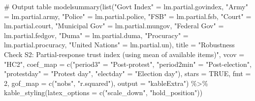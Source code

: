 \documentclass[
  letterpaper,
  DIV=11,
  numbers=noendperiod]{scrartcl}
\newenvironment{Shaded}{\begin{snugshade}}{\end{snugshade}}
\newcommand{\AttributeTok}[1]{\textcolor[rgb]{0.40,0.45,0.13}{#1}}
\newcommand{\CommentTok}[1]{\textcolor[rgb]{0.37,0.37,0.37}{#1}}
\newcommand{\ConstantTok}[1]{\textcolor[rgb]{0.56,0.35,0.01}{#1}}
\newcommand{\DecValTok}[1]{\textcolor[rgb]{0.68,0.00,0.00}{#1}}
\newcommand{\FunctionTok}[1]{\textcolor[rgb]{0.28,0.35,0.67}{#1}}
\newcommand{\NormalTok}[1]{\textcolor[rgb]{0.00,0.23,0.31}{#1}}
\newcommand{\OtherTok}[1]{\textcolor[rgb]{0.00,0.23,0.31}{#1}}
\newcommand{\SpecialCharTok}[1]{\textcolor[rgb]{0.37,0.37,0.37}{#1}}
\newcommand{\StringTok}[1]{\textcolor[rgb]{0.13,0.47,0.30}{#1}}
\begin{document}
\begin{Shaded}
\begin{Highlighting}[]
\CommentTok{\# Output table}
\FunctionTok{modelsummary}\NormalTok{(}\FunctionTok{list}\NormalTok{(}\StringTok{"Gov\textquotesingle{}t Index"} \OtherTok{=}\NormalTok{ lm.partial.govindex, }\StringTok{"Army"} \OtherTok{=}\NormalTok{ lm.partial.army,}
                  \StringTok{"Police"} \OtherTok{=}\NormalTok{ lm.partial.police, }\StringTok{"FSB"} \OtherTok{=}\NormalTok{ lm.partial.fsb,}
                  \StringTok{"Court"} \OtherTok{=}\NormalTok{ lm.partial.court, }\StringTok{"Municipal Gov"} \OtherTok{=}\NormalTok{ lm.partial.mungov,}
                  \StringTok{"Federal Gov"} \OtherTok{=}\NormalTok{ lm.partial.fedgov, }\StringTok{"Duma"} \OtherTok{=}\NormalTok{ lm.partial.duma,}
                  \StringTok{"Procuracy"} \OtherTok{=}\NormalTok{ lm.partial.procuracy, }\StringTok{"United Nations"} \OtherTok{=}\NormalTok{ lm.partial.un),}
             \AttributeTok{title =} \StringTok{"Robustness Check S2: Partial{-}response trust index (using mean of available items)"}\NormalTok{,}
             \AttributeTok{vcov =} \StringTok{"HC2"}\NormalTok{,}
             \AttributeTok{coef\_map =} \FunctionTok{c}\NormalTok{(}\StringTok{"period3"} \OtherTok{=} \StringTok{"Post{-}protest"}\NormalTok{, }
                          \StringTok{"period2min"} \OtherTok{=} \StringTok{"Post{-}election"}\NormalTok{, }
                          \StringTok{"protestday"} \OtherTok{=} \StringTok{"Protest day"}\NormalTok{, }
                          \StringTok{"electday"} \OtherTok{=} \StringTok{"Election day"}\NormalTok{),}
             \AttributeTok{stars =} \ConstantTok{TRUE}\NormalTok{, }\AttributeTok{fmt =} \DecValTok{2}\NormalTok{, }\AttributeTok{gof\_map =} \FunctionTok{c}\NormalTok{(}\StringTok{"nobs"}\NormalTok{, }\StringTok{"r.squared"}\NormalTok{),}
             \AttributeTok{output =} \StringTok{"kableExtra"}\NormalTok{) }\SpecialCharTok{\%\textgreater{}\%} 
   \FunctionTok{kable\_styling}\NormalTok{(}\AttributeTok{latex\_options =} \FunctionTok{c}\NormalTok{(}\StringTok{"scale\_down"}\NormalTok{, }\StringTok{"hold\_position"}\NormalTok{))}
\end{Highlighting}
\end{Shaded}
\end{document}
